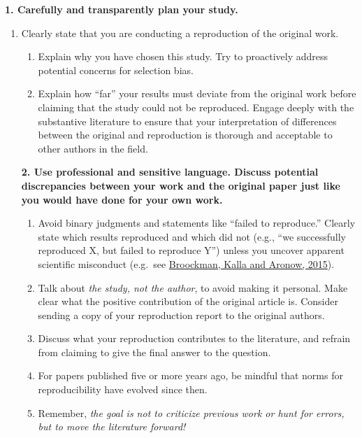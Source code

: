 \documentclass[]{book}
\providecommand{\tightlist}{%
  \setlength{\itemsep}{0pt}\setlength{\parskip}{0pt}}
\begin{document}
\textbf{1. Carefully and transparently plan your study.}

\begin{enumerate}
\def\labelenumi{\alph{enumi}.}
\tightlist
\item
  Clearly state that you are conducting a reproduction of the original work.

  \begin{enumerate}
  \def\labelenumii{\alph{enumii}.}
  \setcounter{enumii}{1}
  \tightlist
  \item
    Explain why you have chosen this study. Try to proactively address potential concerns for selection bias.\\
  \item
    Explain how ``far'' your results must deviate from the original work before claiming that the study could not be reproduced. Engage deeply with the substantive literature to ensure that your interpretation of differences between the original and reproduction is thorough and acceptable to other authors in the field.
  \end{enumerate}

  \textbf{2. Use professional and sensitive language. Discuss potential discrepancies between your work and the original paper just like you would have done for your own work.}

  \begin{enumerate}
  \def\labelenumii{\alph{enumii}.}
  \tightlist
  \item
    Avoid binary judgments and statements like ``failed to reproduce.'' Clearly state which results reproduced and which did not (e.g., ``we successfully reproduced X, but failed to reproduce Y'') unless you uncover apparent scientific misconduct (e.g.~see \href{https://osf.io/qy2se/}{Broockman, Kalla and Aronow, 2015}).\\
  \item
    Talk about \emph{the study, not the author}, to avoid making it personal. Make clear what the positive contribution of the original article is. Consider sending a copy of your reproduction report to the original authors.\\
  \item
    Discuss what your reproduction contributes to the literature, and refrain from claiming to give the final answer to the question.\\
  \item
    For papers published five or more years ago, be mindful that norms for reproducibility have evolved since then.\\
  \item
    Remember, \emph{the goal is not to criticize previous work or hunt for errors, but to move the literature forward!}
  \end{enumerate}
\end{enumerate}
\end{document}
